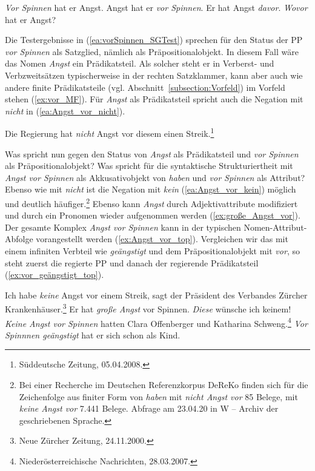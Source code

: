 \ea \label{ea:vorSpinnen_SGTest}
\ea \label{ea:vor_top} \textit{Vor Spinnen} hat er Angst.
\ex \label{ex:vor_MF} Angst hat er \textit{vor Spinnen}.
\ex \label{ex:vorSpinnen_pron} Er hat Angst \textit{davor}. 
\ex \label{ex:vorSpinnen_erfragbar} \textit{Wovor} hat er Angst?
\z 
\z 

Die Testergebnisse in (\ref{ea:vorSpinnen_SGTest}) sprechen für den Status der PP \textit{vor Spinnen} als Satzglied, nämlich als Präpositionalobjekt. In diesem Fall wäre das Nomen \textit{Angst} ein Prädikatsteil. Als solcher steht er in Verberst- und Verbzweitsätzen typischerweise in der rechten Satzklammer, kann aber auch wie andere finite Prädikatsteile (vgl. Abschnitt~\ref{subsection:Vorfeld}) im Vorfeld stehen (\ref{ex:vor_MF}). Für \textit{Angst} als Prädikatsteil spricht auch die Negation mit \textit{nicht} in (\ref{ea:Angst_vor_nicht}).

\ea \label{ea:Angst_vor_nicht} Die Regierung hat \textit{nicht} Angst vor diesem einen Streik.\footnote{Süddeutsche Zeitung, 05.04.2008.}
\z 

Was spricht nun gegen den Status von \textit{Angst} als Prädikatsteil und \textit{vor Spinnen} als Präpositionalobjekt? Was spricht für die syntaktische Strukturiertheit mit \textit{Angst vor Spinnen} als Akkusativobjekt von \textit{haben} und \textit{vor Spinnen} als Attribut? Ebenso wie mit \textit{nicht} ist die Negation mit \textit{kein} (\ref{ea:Angst_vor_kein}) möglich und deutlich häufiger.\footnote{Bei einer Recherche im Deutschen Referenzkorpus DeReKo finden sich für die Zeichenfolge aus finiter Form von \textit{haben} mit \textit{nicht Angst vor} 85 Belege, mit \textit{keine Angst vor} 7.441 Belege. Abfrage am 23.04.20 in W -- Archiv der geschriebenen Sprache.} Ebenso kann \textit{Angst} durch Adjektivattribute modifiziert und durch ein Pronomen wieder aufgenommen werden (\ref{ex:große_Angst_vor}). Der gesamte Komplex \textit{Angst vor Spinnen} kann in der typischen Nomen-Attribut-Abfolge vorangestellt werden (\ref{ex:Angst_vor_top}). Vergleichen wir das mit einem infiniten Verbteil wie \textit{geängstigt} und dem Präpositionalobjekt mit \textit{vor}, so steht zuerst die regierte PP und danach der regierende Prädikatsteil (\ref{ex:vor_geängstigt_top}). 

\ea \label{ea:Angstvor_Obj}
\ea \label{ea:Angst_vor_kein} Ich habe \textit{keine} Angst vor einem Streik, sagt der Präsident des Verbandes Zürcher Krankenhäuser.\footnote{Neue Zürcher Zeitung, 24.11.2000.}
\ex \label{ex:große_Angst_vor} Er hat \textit{große Angst} vor Spinnen. \textit{Diese} wünsche ich keinem!
\ex \label{ex:Angst_vor_top} \textit{Keine Angst vor Spinnen} hatten Clara Offenberger und Katharina Schweng.\footnote{Niederösterreichische Nachrichten, 28.03.2007.} 
\ex \label{ex:vor_geängstigt_top} \textit{Vor Spinnnen geängstigt} hat er sich schon als Kind.
\z 
\z 

